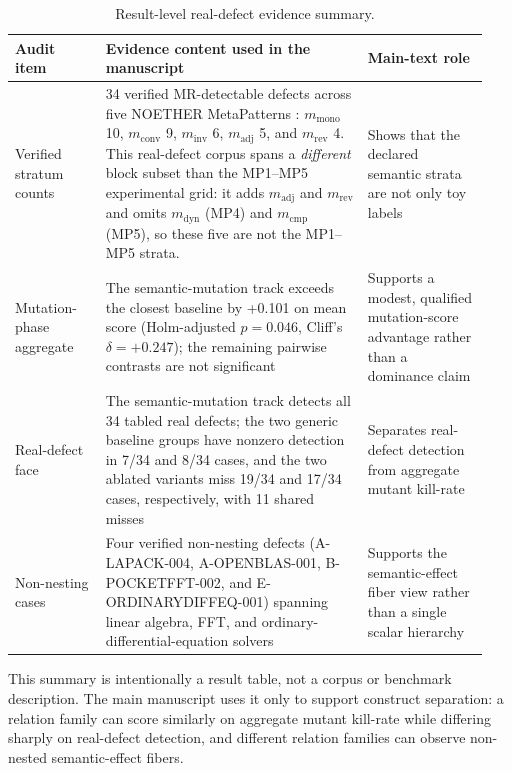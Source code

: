 \documentclass[manuscript,screen,review]{acmart}
\begin{document}
{%
\small
\begin{longtable}[]{@{}p{0.18\linewidth}p{0.52\linewidth}p{0.24\linewidth}@{}}
\caption{Result-level real-defect evidence summary.}\label{tab:realdefect-ledger}\\
\toprule\noalign{}
Audit item & Evidence content used in the manuscript & Main-text role \\
\midrule\noalign{}
\endfirsthead
\endhead
\bottomrule\noalign{}
\endlastfoot
Verified stratum counts & 34 verified MR-detectable defects across five
NOETHER MetaPatterns \citep{noether2026}: \(m_{\mathrm{mono}}\) 10,
\(m_{\mathrm{conv}}\) 9,
\(m_{\mathrm{inv}}\) 6, \(m_{\mathrm{adj}}\) 5, and
\(m_{\mathrm{rev}}\) 4. This real-defect corpus spans a \emph{different}
block subset than the MP1--MP5 experimental grid: it adds
\(m_{\mathrm{adj}}\) and \(m_{\mathrm{rev}}\) and omits \(m_{\mathrm{dyn}}\)
(MP4) and \(m_{\mathrm{cmp}}\) (MP5), so these five are not the MP1--MP5
strata. & Shows that the declared semantic strata are not
only toy labels \\
Mutation-phase aggregate & The semantic-mutation track exceeds the
closest baseline by +0.101 on mean score (Holm-adjusted \(p = 0.046\),
Cliff's \(\delta = +0.247\)); the remaining pairwise contrasts are not
significant & Supports a modest, qualified
mutation-score advantage rather than a dominance claim \\
Real-defect face & The semantic-mutation track detects all 34 tabled
real defects; the two generic baseline groups have nonzero detection in
7/34 and 8/34 cases, and the two ablated variants miss 19/34 and 17/34
cases, respectively, with 11 shared misses & Separates real-defect detection from aggregate mutant
kill-rate \\
Non-nesting cases & Four verified non-nesting defects (A-LAPACK-004,
A-OPENBLAS-001, B-POCKETFFT-002, and E-ORDINARYDIFFEQ-001) spanning
linear
algebra, FFT, and ordinary-differential-equation solvers & Supports the semantic-effect fiber view rather
than a single scalar hierarchy \\
\end{longtable}
\normalsize
}

This summary is intentionally a result table, not a corpus or benchmark
description. The main manuscript uses it only to support construct
separation: a relation family can score similarly on aggregate mutant
kill-rate while differing sharply on real-defect detection, and different
relation families can observe non-nested semantic-effect fibers.
\end{document}
